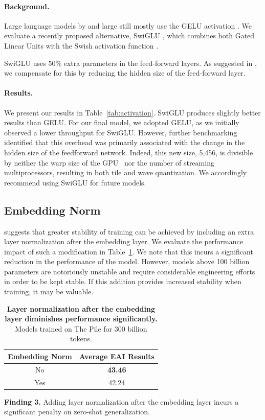 \paragraph{Background.} Large language models by and large still mostly use the GELU activation \cite{hendrycks2016gaussian}. We evaluate a recently proposed alternative, SwiGLU \cite{shazeer2020swiglu}, which combines both Gated Linear Units \cite{dauphin2016glu} with the Swish activation function \cite{ramachandran2017searching}. 

SwiGLU uses $50\% $ extra parameters in the feed-forward layers. As suggested in \citet{shazeer2020swiglu}, we compensate for this by reducing the hidden size of the feed-forward layer. 

\paragraph{Results.} We present our results in Table~\ref{tab:activation}. SwiGLU produces slightly better results than GELU. For our final model, we adopted GELU, as we initially observed a lower throughput for SwiGLU. However, further benchmarking identified that this overhead was primarily associated with the change in the hidden size of the feedforward network. Indeed, this new size, 5,456, is divisible by neither the warp size of the GPU~\citep{Lashgar2013WarpSI} nor the number of streaming multiprocessors, resulting in both tile and wave quantization. We accordingly recommend using SwiGLU for future models.


\subsection{Embedding Norm}

\citet{bitsandbytes} suggests that greater stability of training can be achieved by including an extra layer normalization \cite{layernorm} after the embedding layer. We evaluate the performance impact of such a modification in Table~\ref{tab:emb_norm}. We note that this incurs a significant reduction in the performance of the model. However, models above 100 billion parameters are notoriously unstable and require considerable engineering efforts in order to be kept stable. If this addition provides increased stability when training, it may be valuable. 


\begin{table}[b]
\begin{center}
\begin{tabular}{@{}cc@{}}
\toprule
\textbf{Embedding Norm} & \textbf{Average EAI Results}\\
\midrule
No & \textbf{43.46}\\
Yes &  42.24\\
\bottomrule
\end{tabular}
\end{center}
\caption{\textbf{Layer normalization after the embedding layer diminishes performance significantly.} Models trained on The Pile for 300 billion tokens.}
\label{tab:emb_norm}
\end{table}

\begin{mdframed}
\textbf{Finding 3.} Adding layer normalization after the embedding layer incurs a significant penalty on zero-shot generalization. 
\end{mdframed}
